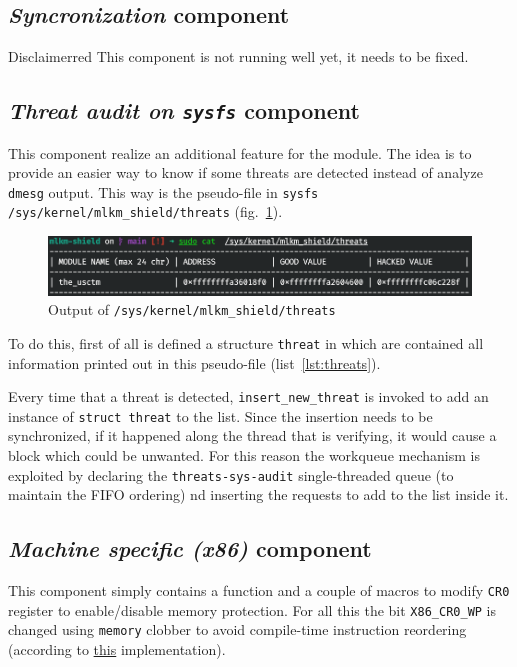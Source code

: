 \documentclass{article}
\begin{document}
	\subsection{\textsl{Syncronization} component}\label{sec:syncro}
	\begin{custombox}{Disclaimer}{red}
		This component is not running well yet, it needs to be fixed.
	\end{custombox}

	\subsection{\textsl{Threat audit on \texttt{sysfs}} component}\label{sec:threats}
	This component realize an additional feature for the module. The idea is to provide an easier way to know if some
	threats are detected instead of analyze \texttt{dmesg} output. This way is the pseudo-file in \texttt{sysfs}
	\texttt{/sys/kernel/mlkm\_shield/threats} (fig.~\ref{fig:threats}).

	\begin{figure}[!htbp]
		\centering
		\includegraphics[scale=0.4]{threats}
		\caption{Output of \texttt{/sys/kernel/mlkm\_shield/threats}}
		\label{fig:threats}
	\end{figure}

	To do this, first of all is defined a structure \texttt{threat} in which are contained all information printed out
	in this pseudo-file (list~\ref{lst:threats}).

	Every time that a threat is detected, \texttt{insert\_new\_threat} is invoked to add an instance of \texttt{struct
	threat} to the list. Since the insertion needs to be synchronized, if it happened along the thread that is
	verifying, it would cause a block which could be unwanted. For this reason the workqueue mechanism is exploited by
	declaring the \texttt{threats-sys-audit} single-threaded queue (to maintain the FIFO ordering) nd inserting the
	requests to add to the list inside it.

	\subsection{\textsl{Machine specific (x86)} component}\label{sec:x86}
	This component simply contains a function and a couple of macros to modify \texttt{CR0} register to enable/disable
	memory protection. For all this the bit \texttt{X86\_CR0\_WP} is changed using \texttt{memory} clobber to avoid
	compile-time instruction reordering (according to
	\href{https://elixir.bootlin.com/linux/v5.17.3/source/arch/x86/include/asm/special_insns.h#L54}{this}
	implementation).
\end{document}
